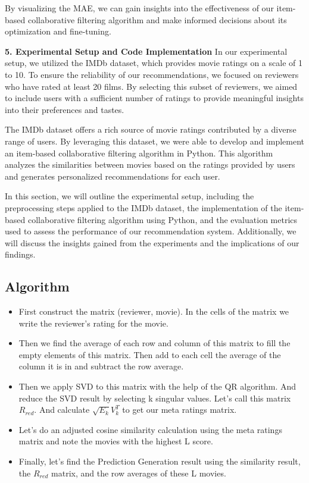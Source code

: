 \documentclass[conference]{IEEEtran}
\begin{document}
By visualizing the MAE, we can gain insights into the effectiveness of our item-based collaborative filtering algorithm and make informed decisions about its optimization and fine-tuning.


\textbf{5. Experimental Setup and Code Implementation}
In our experimental setup, we utilized the IMDb dataset, which provides movie ratings on a scale of 1 to 10. To ensure the reliability of our recommendations, we focused on reviewers who have rated at least 20 films. By selecting this subset of reviewers, we aimed to include users with a sufficient number of ratings to provide meaningful insights into their preferences and tastes.

The IMDb dataset offers a rich source of movie ratings contributed by a diverse range of users. By leveraging this dataset, we were able to develop and implement an item-based collaborative filtering algorithm in Python. This algorithm analyzes the similarities between movies based on the ratings provided by users and generates personalized recommendations for each user.

In this section, we will outline the experimental setup, including the preprocessing steps applied to the IMDb dataset, the implementation of the item-based collaborative filtering algorithm using Python, and the evaluation metrics used to assess the performance of our recommendation system. Additionally, we will discuss the insights gained from the experiments and the implications of our findings.

\subsection {Algorithm}

\begin{itemize}
\item First construct the matrix (reviewer, movie). In the cells of the matrix we write the reviewer's rating for the movie.
\item Then we find the average of each row and column of this matrix to fill the empty elements of this matrix. Then add to each cell the average of the column it is in and subtract the row average.
\item Then we apply SVD to this matrix with the help of the QR algorithm. And reduce the SVD result by selecting k singular values. Let's call this matrix $R_{red}$. And calculate $\sqrt{E_k}V^T_k$ to get our meta ratings matrix.
\item  Let's do an adjusted cosine similarity calculation using the meta ratings matrix and note the movies with the highest L score.
\item Finally, let's find the Prediction Generation result using the similarity result, the $R_{red}$ matrix, and the row averages of these L movies.
\end{itemize}
\end{document}
